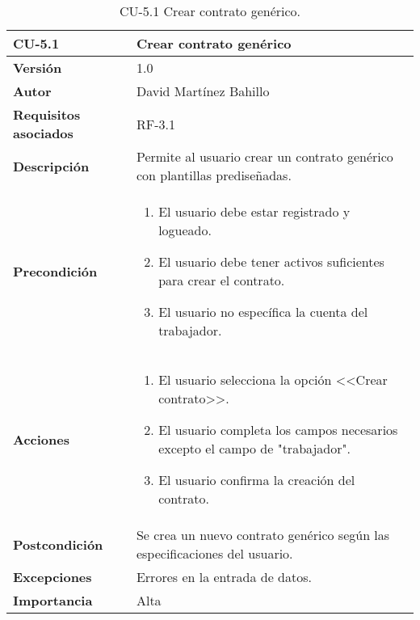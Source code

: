 \begin{table}[p]
	\centering
	\begin{tabularx}{\linewidth}{ p{} p{} }
		\toprule
		\textbf{CU-5.1}  & \textbf{Crear contrato genérico}\\
		\midrule
		\textbf{Versión}              & 1.0    \\
		\textbf{Autor}                & David Martínez Bahillo \\
		\textbf{Requisitos asociados} & RF-3.1 \\
		\textbf{Descripción}          & Permite al usuario crear un contrato genérico con plantillas prediseñadas. \\
		\textbf{Precondición}         &  
		\begin{enumerate}
			\def\labelenumi{\arabic{enumi}.}
			\tightlist
			\item El usuario debe estar registrado y logueado.
			\item El usuario debe tener activos suficientes para crear el contrato.
			\item El usuario no específica la cuenta del trabajador.
		\end{enumerate}\\
		\textbf{Acciones}             &
		\begin{enumerate}
			\def\labelenumi{\arabic{enumi}.}
			\tightlist
			\item El usuario selecciona la opción <<Crear contrato>>.
			\item El usuario completa los campos necesarios excepto el campo de "trabajador".
			\item El usuario confirma la creación del contrato.
		\end{enumerate}\\
		\textbf{Postcondición}        & Se crea un nuevo contrato genérico según las especificaciones del usuario. \\
		\textbf{Excepciones}          & Errores en la entrada de datos. \\
		\textbf{Importancia}          & Alta  \\
		\bottomrule
	\end{tabularx}
	\caption{CU-5.1 Crear contrato genérico.}
\end{table}


